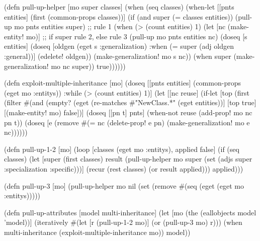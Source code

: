 \documentclass[submission]{eptcs}
\begin{document}
\begin{clojurecode}
(defn pull-up-helper [mo super classes]
  (when (seq classes)
    (when-let [[pnts entities] (first (common-props classes))]
      (if (and super (= classes entities))
        (pull-up mo pnts entities super)  ;; rule 1
        (when (> (count entities) 1)
          (let [nc (make-entity! mo)]     ;; if super rule 2, else rule 3
            (pull-up mo pnts entities nc)
            (doseq [s entities]
              (doseq [oldgen (eget s :generalization)
                      :when (= super (adj oldgen :general))]
                (edelete! oldgen))
              (make-generalization! mo s nc))
            (when super (make-generalization! mo nc super))
            true))))))

(defn exploit-multiple-inheritance [mo]
  (doseq [[pnts entities] (common-props (eget mo :entitys))
          :while (> (count entities) 1)]
    (let [[nc reuse]
          (if-let [top (first (filter
                               #(and (empty? (eget %
                                     (re-matches #"NewClass.*" (eget %
                               entities))]
            [top true]
            [(make-entity! mo) false])]
      (doseq [[pn t] pnts]
        (when-not reuse
          (add-prop! mo nc pn t))
        (doseq [e (remove #(= nc %
          (delete-prop! e pn)
          (make-generalization! mo e nc))))))

(defn pull-up-1-2 [mo]
  (loop [classes (eget mo :entitys), applied false]
    (if (seq classes)
      (let [super (first classes)
            result (pull-up-helper
                    mo super (set (adjs super :specialization :specific)))]
        (recur (rest classes) (or result applied)))
      applied)))

(defn pull-up-3 [mo]
  (pull-up-helper mo nil (set (remove #(seq (eget %
                                      (eget mo :entitys)))))

(defn pull-up-attributes [model multi-inheritance]
  (let [mo (the (eallobjects model 'model))]
    (iteratively #(let [r (pull-up-1-2 mo)]
                    (or (pull-up-3 mo) r)))
    (when multi-inheritance (exploit-multiple-inheritance mo))
    model))
\end{clojurecode}
\end{document}
